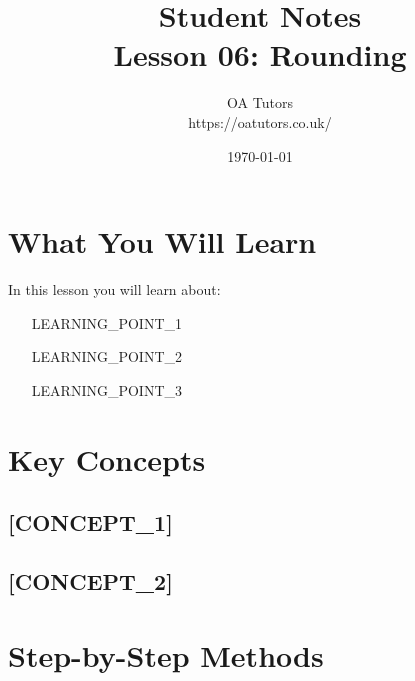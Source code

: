 \documentclass[a4paper,12pt]{article}
\begin{document}
\title{\textcolor{oablue}{\Huge Student Notes} \\ 
       \textcolor{oablue}{\Large Lesson 06: Rounding}}
\author{\textcolor{oablue}{OA Tutors} \\ 
        \textcolor{oagray}{https://oatutors.co.uk/}}
\date{\textcolor{oagray}{\today}}

\maketitle

\section{What You Will Learn}
In this lesson you will learn about:
\begin{itemize}
    \item [LEARNING_POINT_1]
    \item [LEARNING_POINT_2]
    \item [LEARNING_POINT_3]
\end{itemize}

\section{Key Concepts}

\subsection{[CONCEPT_1]}
\begin{keypoint}
\end{keypoint}

\begin{example}
[EXAMPLE_1]
\end{example}

\subsection{[CONCEPT_2]}
\begin{keypoint}
\end{keypoint}

\begin{example}
[EXAMPLE_2]
\end{example}

\section{Step-by-Step Methods}
\end{document}
